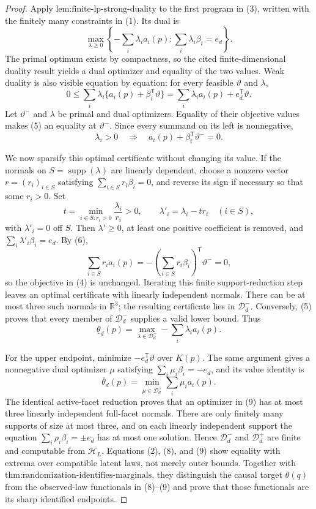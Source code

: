 \documentclass{article}
\begin{document}
\begin{proof}
Apply \(\text{lem:finite-lp-strong-duality}\) to the first program in (3), written with the finitely many constraints in (1).  Its dual is
\[
 \max_{\lambda\geq0}
 \left\{-\sum_i\lambda_i a_i(p):
             \sum_i\lambda_i\beta_i=e_d\right\}.       \tag{4}
\]
The primal optimum exists by compactness, so the cited finite-dimensional duality result yields a dual optimizer and equality of the two values.  Weak duality is also visible equation by equation: for every feasible \(\vartheta\) and \(\lambda\),
\[
 0\leq\sum_i\lambda_i\{a_i(p)+\beta_i^{\mathsf T}\vartheta\}
 =\sum_i\lambda_i a_i(p)+e_d^{\mathsf T}\vartheta.     \tag{5}
\]
Let \(\vartheta^-\) and \(\lambda\) be primal and dual optimizers.  Equality of their objective values makes (5) an equality at \(\vartheta^-\).  Since every summand on its left is nonnegative,
\[
 \lambda_i>0\quad\Longrightarrow\quad
 a_i(p)+\beta_i^{\mathsf T}\vartheta^-=0.              \tag{6}
\]

We now sparsify this optimal certificate without changing its value.  If the normals on \(S=\operatorname{supp}(\lambda)\) are linearly dependent, choose a nonzero vector \(r=(r_i)_{i\in S}\) satisfying \(\sum_{i\in S}r_i\beta_i=0\), and reverse its sign if necessary so that some \(r_i>0\).  Set
\[
 t=\min_{i\in S:r_i>0}\frac{\lambda_i}{r_i}>0,
 \qquad
 \lambda'_i=\lambda_i-tr_i\quad(i\in S),
\]
with \(\lambda'_i=0\) off \(S\).  Then \(\lambda'\geq0\), at least one positive coefficient is removed, and \(\sum_i\lambda'_i\beta_i=e_d\).  By (6),
\[
 \sum_{i\in S}r_i a_i(p)
 =-\left(\sum_{i\in S}r_i\beta_i\right)^{\mathsf T}\vartheta^-=0,             \tag{7}
\]
so the objective in (4) is unchanged.  Iterating this finite support-reduction step leaves an optimal certificate with linearly independent normals.  There can be at most three such normals in \(\mathbb R^3\); the resulting certificate lies in \(\mathcal D_d^-\).  Conversely, (5) proves that every member of \(\mathcal D_d^-\) supplies a valid lower bound.  Thus
\[
 \underline\theta_d(p)=
 \max_{\lambda\in\mathcal D_d^-}-\sum_i\lambda_i a_i(p).                    \tag{8}
\]

For the upper endpoint, minimize \(-e_d^{\mathsf T}\vartheta\) over \(K(p)\).  The same argument gives a nonnegative dual optimizer \(\mu\) satisfying \(\sum_i\mu_i\beta_i=-e_d\), and its value identity is
\[
 \overline\theta_d(p)=
 \min_{\mu\in\mathcal D_d^+}\sum_i\mu_i a_i(p).                            \tag{9}
\]
The identical active-facet reduction proves that an optimizer in (9) has at most three linearly independent full-facet normals.  There are only finitely many supports of size at most three, and on each linearly independent support the equation \(\sum_i\rho_i\beta_i=\pm e_d\) has at most one solution.  Hence \(\mathcal D_d^-\) and \(\mathcal D_d^+\) are finite and computable from \(\mathcal H_L\).  Equations (2), (8), and (9) show equality with extrema over compatible latent laws, not merely outer bounds.  Together with \(\text{thm:randomization-identifies-marginals}\), they distinguish the causal target \(\theta(q)\) from the observed-law functionals in (8)--(9) and prove that those functionals are its sharp identified endpoints.


\end{proof}
\end{document}
